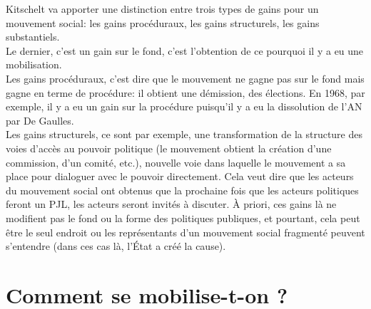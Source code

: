 \documentclass[10pt, a4paper, openany]{book}
\begin{document}
Kitschelt va apporter une distinction entre trois types de gains pour un mouvement social: les gains procéduraux, les gains structurels, les gains substantiels. \\
Le dernier, c'est un gain sur le fond, c'est l'obtention de ce pourquoi il y a eu une mobilisation. \\
Les gains procéduraux, c'est dire que le mouvement ne gagne pas sur le fond mais gagne en terme de procédure: il obtient une démission, des élections. En 1968, par exemple, il y a eu un gain sur la procédure puisqu'il y a eu la dissolution de l'AN par De Gaulles. \\
Les gains structurels, ce sont par exemple, une transformation de la structure des voies d'accès au pouvoir politique (le mouvement obtient la création d'une commission, d'un comité, etc.), nouvelle voie dans laquelle le mouvement a sa place pour dialoguer avec le pouvoir directement. Cela veut dire que les acteurs du mouvement social ont obtenus que la prochaine fois que les acteurs politiques feront un PJL, les acteurs seront invités à discuter. À priori, ces gains là ne modifient pas le fond ou la forme des politiques publiques, et pourtant, cela peut être le seul endroit ou les représentants d'un mouvement social fragmenté peuvent s'entendre (dans ces cas là, l'État a créé la cause). 







\part{Comment se mobilise-t-on ?}
\end{document}

